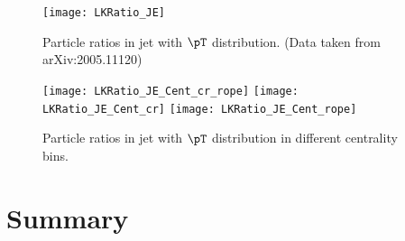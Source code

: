 \documentclass[ALICE,manyauthors]{StrinJet}
\begin{document}
\begin{figure}[ht]
	\begin{center}
		\texttt{[image: LKRatio\_JE]}
	\end{center}
	\caption{Particle ratios in jet with $\pT$ distribution. (Data taken from arXiv:2005.11120)}
	\label{fig:JEParRatio}
\end{figure}


\begin{figure}[ht]
	\begin{center}
		\texttt{[image: LKRatio\_JE\_Cent\_cr\_rope]}
		\texttt{[image: LKRatio\_JE\_Cent\_cr]}
		\texttt{[image: LKRatio\_JE\_Cent\_rope]}

	\end{center}
	\caption{Particle ratios in jet with $\pT$ distribution in different centrality bins.}
	\label{fig:JEParRatioCent}
\end{figure}

\clearpage
\section{Summary}
\label{sec:sum}


\newenvironment{acknowledgement}{\relax}{\relax}
%
\end{document}
